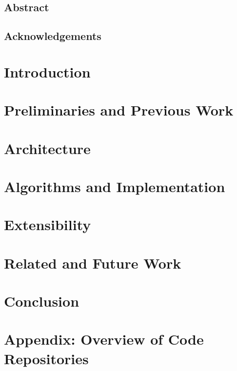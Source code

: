 \documentclass[12pt]{report}
\theoremstyle{definition}
\begin{document}
\newpage
\section*{\centering Abstract}

\thispagestyle{empty}

\newpage
\section*{\centering Acknowledgements}


\setcounter{tocdepth}{0}
{\hypersetup{linkcolor=black}
 \tableofcontents
}
\thispagestyle{empty}

\setcounter{page}{0}
\chapter{Introduction}


\chapter{Preliminaries and Previous Work}
\label{chap:prelim}


\chapter{Architecture}
\label{chap:arch}


\chapter{Algorithms and Implementation}
\label{chap:algoimp}


\chapter{Extensibility}
\label{chap:extensible}


\chapter{Related and Future Work}
\label{chap:conclusion}


\chapter{Conclusion}
\label{chap:realconclusion}


\chapter*{Appendix: Overview of Code Repositories}
\label{appendix:a}




\end{document}
